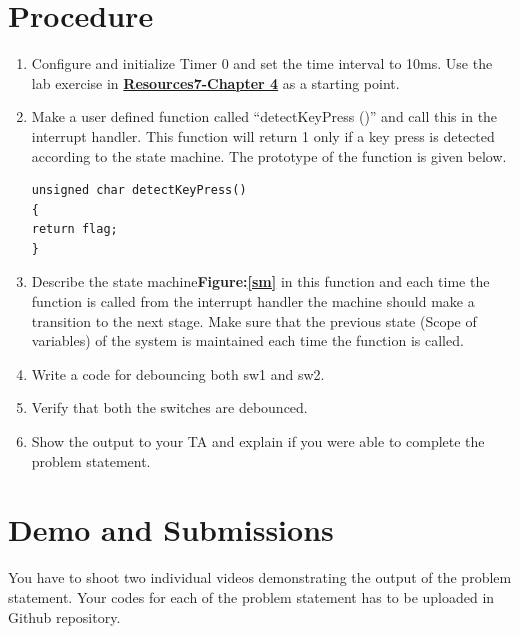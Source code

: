 \documentclass{article} %
\newcounter{source}
\begin{document}
\section {Procedure}
\begin{enumerate}
\item 
Configure and initialize Timer 0 and set the time interval to 10ms. Use the lab exercise in \href{https://www.cse.iitb.ac.in/~erts/html_pages/Resources/Tiva/TM4C123G_LaunchPad_Workshop_Workbook.pdf}{\textbf{Resources7-Chapter 4}} as a starting point.
\item
Make a user defined function called “detectKeyPress ()” and call this in the interrupt handler. This function will return 1 only if a key press is detected according to the state machine.
The prototype of the function is given below.
\begin{verbatim}
unsigned char detectKeyPress()
{
return flag;
}
\end{verbatim}
\item
Describe the state machine\textbf{Figure:\ref{sm}} in this function and each time the function is called from the interrupt handler the machine should make a transition to the next stage. Make sure that the previous state (Scope of variables) of the system is maintained each time the function is called.
\item
Write a code for debouncing both sw1 and sw2.
\item
Verify that both the switches are debounced.
\item
Show the output to your TA and explain if you were able to complete the problem statement.
\end{enumerate}





\section {Demo and Submissions}
You have to shoot two individual videos demonstrating the output of the problem statement.
Your codes for each of the problem statement has to be uploaded in Github repository.
\end{document}
